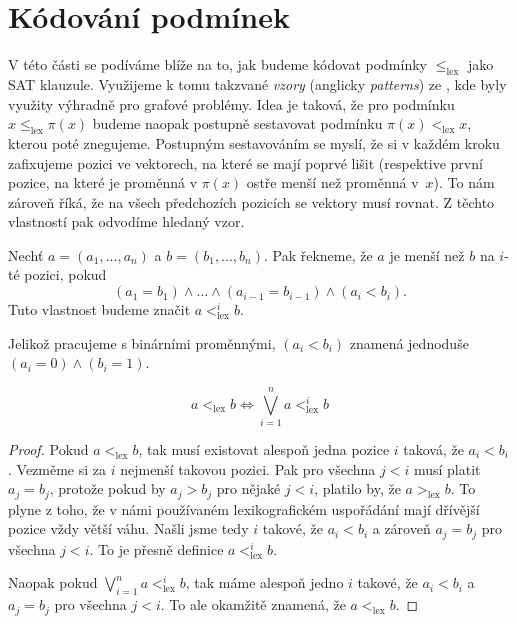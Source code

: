 \section{Kódování podmínek}
V této části se podíváme blíže na to, jak budeme kódovat podmínky $\leq_{\text{lex}}$ jako SAT klauzule. Využijeme k tomu takzvané \emph{vzory} (anglicky \emph{patterns}) ze \cite{codish2025breakingsymmetriessetcoveringperspective}, kde byly využity výhradně pro grafové problémy. Idea je taková, že pro podmínku $x \leq_{\text{lex}} \pi(x)$ budeme naopak postupně sestavovat podmínku $\pi(x) <_{\text{lex}} x$, kterou poté znegujeme. Postupným sestavováním se myslí, že si v každém kroku zafixujeme pozici ve vektorech, na které se mají poprvé lišit (respektive první pozice, na které je proměnná v $\pi(x)$ ostře menší než proměnná v $x$). To nám zároveň říká, že na všech předchozích pozicích se vektory musí rovnat. Z těchto vlastností pak odvodíme hledaný vzor. 

\begin{definice}
Nechť $a = (a_1,...,a_n)$ a $b = (b_1,...,b_n)$. Pak řekneme, že $a$ je menší než $b$ na $i$-té pozici, pokud
$$(a_1 = b_1) \land ... \land (a_{i-1} = b_{i-1}) \land (a_i < b_i).$$
Tuto vlastnost budeme značit $a <_{\text{lex}}^{i} b$.
\end{definice}

\begin{pozn}
Jelikož pracujeme s binárními proměnnými, $(a_i < b_i)$ znamená jednoduše $(a_i = 0) \land (b_i = 1)$.
\end{pozn}

\begin{lemma}
$$a <_{\text{lex}} b \Leftrightarrow \bigvee_{i=1}^{n} a <_{\text{lex}}^{i} b$$
\end{lemma}

\begin{proof}
Pokud $a <_{\text{lex}} b$, tak musí existovat alespoň jedna pozice $i$ taková, že $a_i < b_i$. Vezměme si za $i$ nejmenší takovou pozici. Pak pro všechna $j<i$ musí platit $a_j = b_j$, protože pokud by $a_j > b_j$ pro nějaké $j < i$, platilo by, že $a >_{\text{lex}} b$. To plyne z toho, že v námi používaném lexikografickém uspořádání mají dřívější pozice vždy větší váhu. Našli jsme tedy $i$ takové, že $a_i < b_i$ a zároveň $a_j = b_j$ pro všechna $j < i$. To je přesně definice $a <_{\text{lex}}^{i} b$.

Naopak pokud $\bigvee_{i=1}^{n} a <_{\text{lex}}^{i} b$, tak máme alespoň jedno $i$ takové, že $a_i < b_i$ a $a_j = b_j$ pro všechna $j < i$. To ale okamžitě znamená, že $a <_{\text{lex}} b$.
\end{proof}

